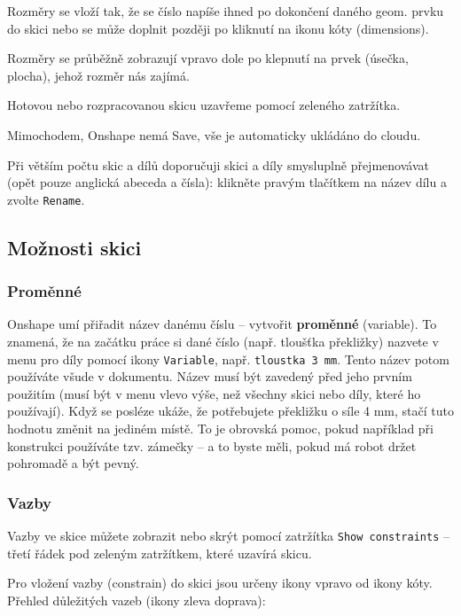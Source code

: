 Rozměry se vloží tak, že se číslo napíše ihned po dokončení daného geom. prvku do skici 
nebo se může doplnit později po kliknutí na ikonu kóty (dimensions).

Rozměry se průběžně zobrazují vpravo dole po klepnutí na prvek (úsečka, plocha), jehož rozměr nás zajímá. 

Hotovou nebo rozpracovanou skicu uzavřeme pomocí zeleného zatržítka. 

Mimochodem, Onshape nemá Save, vše je automaticky ukládáno do cloudu.

Při větším počtu skic a dílů doporučuji skici a díly smysluplně přejmenovávat (opět pouze anglická abeceda a čísla): klikněte pravým tlačítkem na název dílu a zvolte {\tt Rename}.

\subsection{Možnosti skici} \label{skica:možnosti}


\subsubsection{Proměnné}

Onshape umí přiřadit název danému číslu -- vytvořit \textbf{proměnné} (variable). 
To znamená, že na začátku práce si dané číslo (např. tloušťka překližky) nazvete v menu pro díly pomocí ikony {\tt Variable}, např. {\tt tloustka  3 mm}. 
Tento název potom používáte všude v dokumentu. 
Název musí být zavedený před jeho prvním použitím (musí být v menu vlevo výše, než všechny skici nebo  díly, které ho používají).
Když se posléze ukáže, že potřebujete překližku o síle 4 mm, stačí tuto hodnotu změnit na jediném místě. 
To je obrovská pomoc, pokud například při konstrukci používáte tzv. zámečky -- a to byste měli, pokud má robot držet pohromadě a být pevný. 

\subsubsection{Vazby}

Vazby ve skice můžete zobrazit nebo skrýt pomocí zatržítka {\tt Show constraints} -- třetí řádek pod zeleným zatržítkem, které uzavírá skicu. 

Pro vložení vazby (constrain) do skici jsou určeny ikony vpravo od ikony kóty. 
Přehled důležitých vazeb (ikony zleva doprava): 

